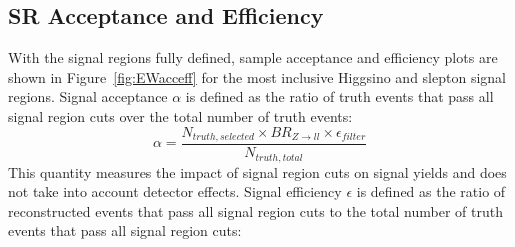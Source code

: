\begin{table}[]
 \tiny
\centering
{}
\caption{Slepton specific signal region cuts}
\label{tab:SRMLLMT2}
\end{table}

\subsection{SR Acceptance and Efficiency}
With the signal regions fully defined, sample acceptance and efficiency plots are shown in Figure~\ref{fig:EWacceff} for the most inclusive Higgsino and slepton signal regions.  Signal acceptance $\alpha$ is defined as the ratio of truth events that pass all signal region cuts over the total number of truth events:
  \begin{equation}
  \alpha = \frac{N_{truth,selected}\times{BR_{Z\rightarrow ll}}\times{\epsilon_{filter}}}{N_{truth,total}}
 \label{eq:acceptance}
  \end{equation}
This quantity measures the impact of signal region cuts on signal yields and does not take into account detector effects.  Signal efficiency $\epsilon$ is defined as the ratio of reconstructed events that pass all signal region cuts to the total number of truth events that pass all signal region cuts:
 
